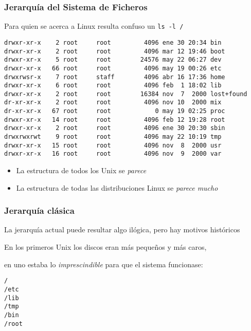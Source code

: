 \documentclass[ucs]{beamer}
\begin{document}
\begin{frame}[fragile]
\frametitle{Jerarquía del Sistema de Ficheros }
Para quien se acerca a Linux resulta confuso un \verb|ls -l / |
\begin{footnotesize}
\begin{verbatim}
drwxr-xr-x    2 root     root         4096 ene 30 20:34 bin
drwxr-xr-x    2 root     root         4096 mar 12 19:46 boot
drwxr-xr-x    5 root     root        24576 may 22 06:27 dev
drwxr-xr-x   66 root     root         4096 may 19 00:26 etc
drwxrwsr-x    7 root     staff        4096 abr 16 17:36 home
drwxr-xr-x    6 root     root         4096 feb  1 18:02 lib
drwxr-xr-x    2 root     root        16384 nov  7  2000 lost+found
dr-xr-xr-x    2 root     root         4096 nov 10  2000 mix
dr-xr-xr-x   67 root     root            0 may 19 02:25 proc
drwxr-xr-x   14 root     root         4096 feb 12 19:28 root
drwxr-xr-x    2 root     root         4096 ene 30 20:30 sbin
drwxrwxrwt    9 root     root         4096 may 22 10:19 tmp
drwxr-xr-x   15 root     root         4096 nov  8  2000 usr
drwxr-xr-x   16 root     root         4096 nov  9  2000 var
\end{verbatim}
\end{footnotesize}

\end{frame}



\begin{frame}[fragile]
\begin{itemize}

\item La estructura de todos los Unix se \emph{parece}
\item La estructura de todas las distribuciones Linux 
se \emph{parece mucho}
\end{itemize}
\end{frame}




\begin{frame}[fragile]

\frametitle{Jerarquía clásica}
La jerarquía actual puede resultar algo ilógica, 
pero hay motivos históricos

En los primeros Unix los discos eran más pequeños y más caros, 

en uno estaba lo \emph{imprescindible} para que el sistema funcionase:
\begin{verbatim}
/
/etc
/lib
/tmp
/bin
/root
\end{verbatim}
\end{frame}
\end{document}
